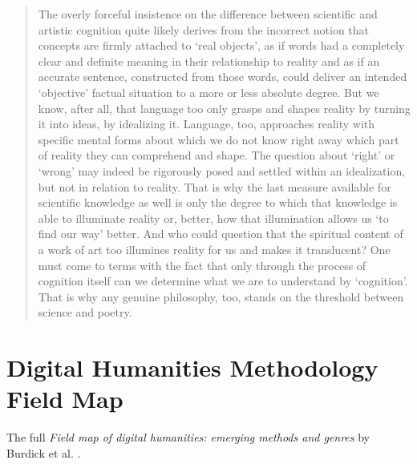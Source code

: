 \begin{quotation}
  The overly forceful insistence on the difference between scientific and artistic cognition quite likely derives from the incorrect notion that concepts are firmly attached to `real objects', as if words had a completely clear and definite meaning in their relationship to reality and as if an accurate sentence, constructed from those words, could deliver an intended `objective' factual situation to a more or less absolute degree. But we know, after all, that language too only grasps and shapes reality by turning it into ideas, by idealizing it. Language, too, approaches reality with specific mental forms about which we do not know right away which part of reality they can comprehend and shape. The question about `right' or `wrong' may indeed be rigorously posed and settled within an idealization, but not in relation to reality. That is why the last measure available for scientific knowledge as well is only the degree to which that knowledge is able to illuminate reality or, better, how that illumination allows us `to find our way' better. And who could question that the spiritual content of a work of art too illumines reality for us and makes it translucent? One must come to terms with the fact that only through the process of cognition itself can we determine what we are to understand by `cognition'. That is why any genuine philosophy, too, stands on the threshold between science and poetry. 
\end{quotation}


\section{Digital Humanities Methodology Field Map}
\label{s:dhmap}

The full \textit{Field map of digital humanities: emerging methods and genres} by Burdick et al. \citeyear{Burdick2012}.

